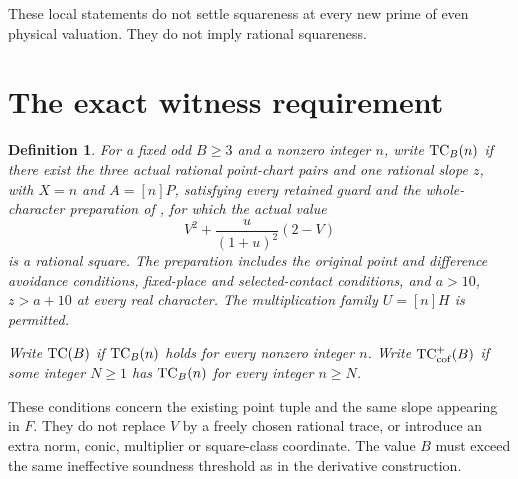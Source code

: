 \documentclass[11pt,a4paper]{article}
\newtheorem{definition}[theorem]{Definition}
\begin{document}
These local statements do not settle squareness at every new prime
of even physical valuation. They do not imply rational squareness.

\section{The exact witness requirement}

\begin{definition}\label{def:TC}
For a fixed odd $B\ge3$ and a nonzero integer $n$, write
$\operatorname{TC}_B(n)$ if there exist the three actual rational point-chart
pairs and one rational slope $z$, with $X=n$ and $A=[n]P$,
satisfying every retained guard and the whole-character preparation
of \cite{Derivative}, for which the actual value
\[
                          V^2+\frac{u}{(1+u)^2}(2-V)
\]
is a rational square. The preparation includes the original point
and difference avoidance conditions, fixed-place and selected-contact
conditions, and $a>10$, $z>a+10$ at every real character.
The multiplication family $U=[n]H$ is permitted.

Write $\operatorname{TC}(B)$ if $\operatorname{TC}_B(n)$ holds for every nonzero integer $n$.
Write $\operatorname{TC}^+_{\mathrm{cof}}(B)$ if some integer $N\ge1$ has
$\operatorname{TC}_B(n)$ for every integer $n\ge N$.
\end{definition}

These conditions concern the existing point tuple and the same slope
appearing in $F$. They do not replace $V$ by a freely chosen rational
trace, or introduce an extra norm, conic, multiplier or square-class
coordinate. The value $B$ must exceed the same ineffective soundness
threshold as in the derivative construction.
\end{document}

